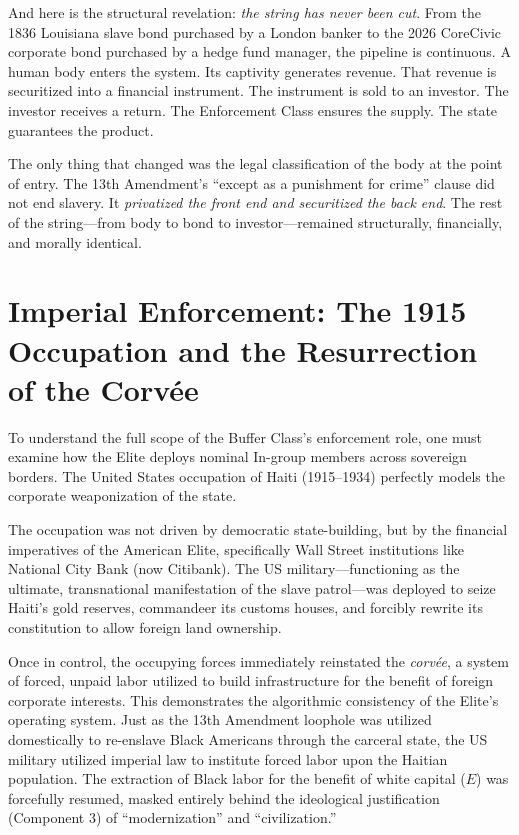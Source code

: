 \documentclass[12pt,openany]{book}
\begin{document}
And here is the structural revelation: \textit{the string has never been cut}. From the 1836 Louisiana slave bond purchased by a London banker to the 2026 CoreCivic corporate bond purchased by a hedge fund manager, the pipeline is continuous. A human body enters the system. Its captivity generates revenue. That revenue is securitized into a financial instrument. The instrument is sold to an investor. The investor receives a return. The Enforcement Class ensures the supply. The state guarantees the product.

The only thing that changed was the legal classification of the body at the point of entry. The 13th Amendment's ``except as a punishment for crime'' clause did not end slavery. It \textit{privatized the front end and securitized the back end}. The rest of the string---from body to bond to investor---remained structurally, financially, and morally identical.

\section{Imperial Enforcement: The 1915 Occupation and the Resurrection of the Corv\'{e}e}

To understand the full scope of the Buffer Class's enforcement role, one must examine how the Elite deploys nominal In-group members across sovereign borders. The United States occupation of Haiti (1915–1934) perfectly models the corporate weaponization of the state.

The occupation was not driven by democratic state-building, but by the financial imperatives of the American Elite, specifically Wall Street institutions like National City Bank (now Citibank). The US military—functioning as the ultimate, transnational manifestation of the slave patrol—was deployed to seize Haiti's gold reserves, commandeer its customs houses, and forcibly rewrite its constitution to allow foreign land ownership.

Once in control, the occupying forces immediately reinstated the \textit{corv\'{e}e}, a system of forced, unpaid labor utilized to build infrastructure for the benefit of foreign corporate interests. This demonstrates the algorithmic consistency of the Elite's operating system. Just as the 13th Amendment loophole was utilized domestically to re-enslave Black Americans through the carceral state, the US military utilized imperial law to institute forced labor upon the Haitian population. The extraction of Black labor for the benefit of white capital ($E$) was forcefully resumed, masked entirely behind the ideological justification (Component 3) of ``modernization'' and ``civilization.''
\end{document}
